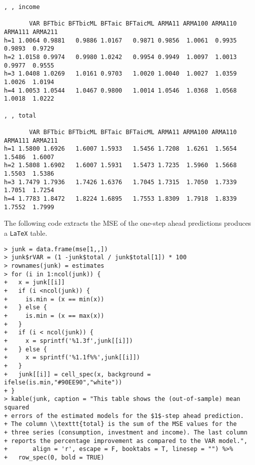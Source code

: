 \documentclass[]{article}
\begin{document}
\begin{verbatim}
, , income

       VAR BFTbic BFTbicML BFTaic BFTaicML ARMA11 ARMA100 ARMA110 ARMA111 ARMA211
h=1 1.0064 0.9881   0.9886 1.0167   0.9871 0.9856  1.0061  0.9935  0.9893  0.9729
h=2 1.0158 0.9974   0.9980 1.0242   0.9954 0.9949  1.0097  1.0013  0.9977  0.9555
h=3 1.0408 1.0269   1.0161 0.9703   1.0020 1.0040  1.0027  1.0359  1.0026  1.0194
h=4 1.0053 1.0544   1.0467 0.9800   1.0014 1.0546  1.0368  1.0568  1.0018  1.0222

, , total

       VAR BFTbic BFTbicML BFTaic BFTaicML ARMA11 ARMA100 ARMA110 ARMA111 ARMA211
h=1 1.5800 1.6926   1.6007 1.5933   1.5456 1.7208  1.6261  1.5654  1.5486  1.6007
h=2 1.5808 1.6902   1.6007 1.5931   1.5473 1.7235  1.5960  1.5668  1.5503  1.5386
h=3 1.7479 1.7936   1.7426 1.6376   1.7045 1.7315  1.7050  1.7339  1.7051  1.7254
h=4 1.7783 1.8472   1.8224 1.6895   1.7553 1.8309  1.7918  1.8339  1.7552  1.7999
\end{verbatim}

The following code extracts the MSE of the one-step ahead predictions
produces a \texttt{LaTeX} table.

\begin{verbatim}
> junk = data.frame(mse[1,,])
> junk$rVAR = (1 -junk$total / junk$total[1]) * 100
> rownames(junk) = estimates
> for (i in 1:ncol(junk)) {
+   x = junk[[i]]
+   if (i <ncol(junk)) {
+     is.min = (x == min(x))
+   } else {
+     is.min = (x == max(x))
+   }
+   if (i < ncol(junk)) {
+     x = sprintf('%1.3f',junk[[i]])
+   } else {
+     x = sprintf('%1.1f%%',junk[[i]])
+   }
+   junk[[i]] = cell_spec(x, background = ifelse(is.min,"#90EE90","white"))
+ }
> kable(junk, caption = "This table shows the (out-of-sample) mean squared 
+ errors of the estimated models for the $1$-step ahead prediction. 
+ The column \\texttt{total} is the sum of the MSE values for the 
+ three series (consumption, investment and income). The last column 
+ reports the percentage improvement as compared to the VAR model.", 
+       align = 'r', escape = F, booktabs = T, linesep = "") %>% 
+   row_spec(0, bold = TRUE)
\end{verbatim}
\end{document}
